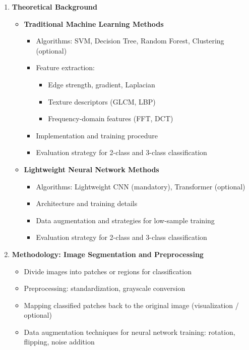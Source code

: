 \begin{enumerate}
      \item \textbf{Theoretical Background}
            \begin{itemize}
                  \item \textbf{Traditional Machine Learning Methods}
                        \begin{itemize}
                              \item Algorithms: SVM, Decision Tree, Random Forest, Clustering (optional)
                              \item Feature extraction:
                                    \begin{itemize}
                                          \item Edge strength, gradient, Laplacian
                                          \item Texture descriptors (GLCM, LBP)
                                          \item Frequency-domain features (FFT, DCT)
                                    \end{itemize}
                              \item Implementation and training procedure
                              \item Evaluation strategy for 2-class and 3-class classification
                        \end{itemize}
                  \item \textbf{Lightweight Neural Network Methods}
                        \begin{itemize}
                              \item Algorithms: Lightweight CNN (mandatory), Transformer (optional)
                              \item Architecture and training details
                              \item Data augmentation and strategies for low-sample training
                              \item Evaluation strategy for 2-class and 3-class classification
                        \end{itemize}
            \end{itemize}

      \item \textbf{Methodology: Image Segmentation and Preprocessing}
            \begin{itemize}
                  \item Divide images into patches or regions for classification
                  \item Preprocessing: standardization, grayscale conversion
                  \item Mapping classified patches back to the original image (visualization /
                        optional)
                  \item Data augmentation techniques for neural network training: rotation, flipping,
                        noise addition
            \end{itemize}


\end{enumerate}
